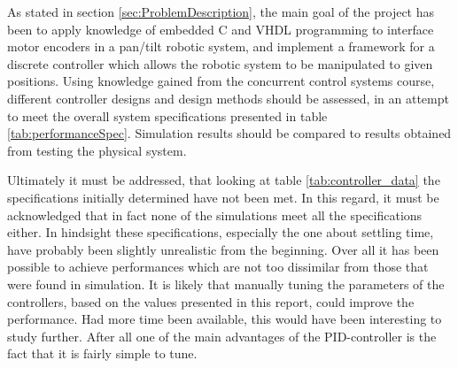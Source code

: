 \documentclass[../../main.tex]{subfiles}
\begin{document}
As stated in section \ref{sec:ProblemDescription}, the main goal of the project has been to apply knowledge of embedded C and VHDL programming to interface motor encoders in a pan/tilt robotic system, and implement a framework for a discrete controller which allows the robotic system to be manipulated to given positions. Using knowledge gained from the concurrent control systems course, different controller designs and design methods should be assessed, in an attempt to meet the overall system specifications presented in table \ref{tab:performanceSpec}. Simulation results should be compared to results obtained from testing the physical system.

Ultimately it must be addressed, that looking at table \ref{tab:controller_data} the specifications initially determined have not been met. In this regard, it must be acknowledged that in fact none of the simulations meet all the specifications either. In hindsight these specifications, especially the one about settling time, have probably been slightly unrealistic from the beginning. Over all it has been possible to achieve performances which are not too dissimilar from those that were found in simulation. It is likely that manually tuning the parameters of the controllers, based on the values presented in this report, could improve the performance. Had more time been available, this would have been interesting to study further. After all one of the main advantages of the PID-controller is the fact that it is fairly simple to tune. 
\end{document}
